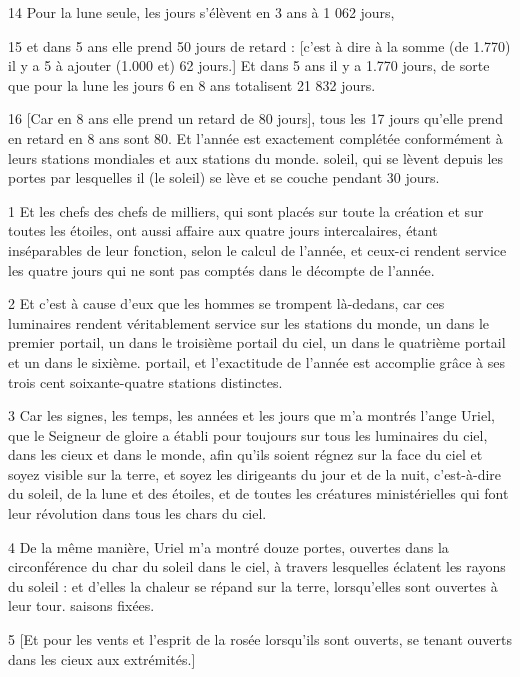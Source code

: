 \par 14 Pour la lune seule, les jours s'élèvent en 3 ans à 1 062 jours,
\par 15 et dans 5 ans elle prend 50 jours de retard : [c'est à dire à la somme (de 1.770) il y a 5 à ajouter (1.000 et) 62 jours.] Et dans 5 ans il y a 1.770 jours, de sorte que pour la lune les jours 6 en 8 ans totalisent 21 832 jours.
\par 16 [Car en 8 ans elle prend un retard de 80 jours], tous les 17 jours qu'elle prend en retard en 8 ans sont 80. Et l'année est exactement complétée conformément à leurs stations mondiales et aux stations du monde. soleil, qui se lèvent depuis les portes par lesquelles il (le soleil) se lève et se couche pendant 30 jours.


\par 1 Et les chefs des chefs de milliers, qui sont placés sur toute la création et sur toutes les étoiles, ont aussi affaire aux quatre jours intercalaires, étant inséparables de leur fonction, selon le calcul de l'année, et ceux-ci rendent service les quatre jours qui ne sont pas comptés dans le décompte de l'année.
\par 2 Et c'est à cause d'eux que les hommes se trompent là-dedans, car ces luminaires rendent véritablement service sur les stations du monde, un dans le premier portail, un dans le troisième portail du ciel, un dans le quatrième portail et un dans le sixième. portail, et l'exactitude de l'année est accomplie grâce à ses trois cent soixante-quatre stations distinctes.
\par 3 Car les signes, les temps, les années et les jours que m'a montrés l'ange Uriel, que le Seigneur de gloire a établi pour toujours sur tous les luminaires du ciel, dans les cieux et dans le monde, afin qu'ils soient régnez sur la face du ciel et soyez visible sur la terre, et soyez les dirigeants du jour et de la nuit, c'est-à-dire du soleil, de la lune et des étoiles, et de toutes les créatures ministérielles qui font leur révolution dans tous les chars du ciel.
\par 4 De la même manière, Uriel m'a montré douze portes, ouvertes dans la circonférence du char du soleil dans le ciel, à travers lesquelles éclatent les rayons du soleil : et d'elles la chaleur se répand sur la terre, lorsqu'elles sont ouvertes à leur tour. saisons fixées.
\par 5 [Et pour les vents et l'esprit de la rosée lorsqu'ils sont ouverts, se tenant ouverts dans les cieux aux extrémités.]
